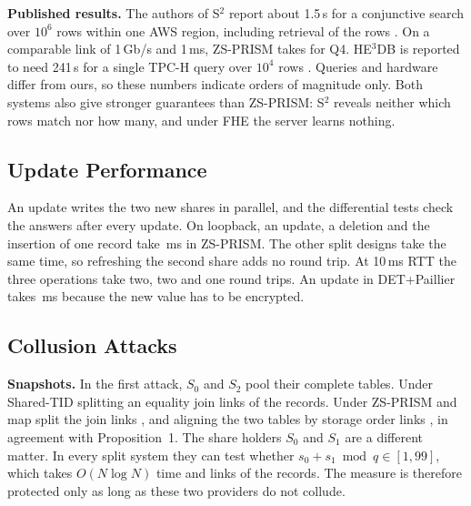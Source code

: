 \documentclass[conference]{IEEEtran}
\newcommand{\sys}{ZS-PRISM}
\begin{document}
\begin{table}[t]
\centering
\caption{Median query latency (ms) of SecretFlow-SCQL and the split designs on Adult and on $10^6$ records over an emulated 100\,Mb/s link with 20\,ms RTT.}
\label{tab:scql}
\scriptsize
\setlength{\tabcolsep}{3pt}

\end{table}

\textbf{Published results.} The authors of S$^2$ report about 1.5\,s for a conjunctive search over $10^6$ rows within one AWS region, including retrieval of the rows \cite{sharma2023s2}. On a comparable link of 1\,Gb/s and 1\,ms, \sys{} takes \EightZSQfourLan{} for Q4. HE$^3$DB is reported to need 241\,s for a single TPC-H query over $10^4$ rows \cite{bian2023he3db}. Queries and hardware differ from ours, so these numbers indicate orders of magnitude only. Both systems also give stronger guarantees than \sys{}: S$^2$ reveals neither which rows match nor how many, and under FHE the server learns nothing.

\subsection{Update Performance}
An update writes the two new shares in parallel, and the differential tests check the answers after every update. On loopback, an update, a deletion and the insertion of one record take \WriteZS{}\,ms in \sys{}. The other split designs take the same time, so refreshing the second share adds no round trip. At 10\,ms RTT the three operations take two, two and one round trips. An update in DET+Paillier takes \WritePaillier{}\,ms because the new value has to be encrypted.

\subsection{Collusion Attacks}\label{sec:attacks}
\textbf{Snapshots.} In the first attack, $S_0$ and $S_2$ pool their complete tables. Under Shared-TID splitting an equality join links \SnapShared{} of the records. Under \sys{} and map split the join links \SnapZS{}, and aligning the two tables by storage order links \SnapRankZS{}, in agreement with Proposition~1. The share holders $S_0$ and $S_1$ are a different matter. In every split system they can test whether $s_0+s_1\bmod q\in[1,99]$, which takes $O(N\log N)$ time and links \SnapShareSum{} of the records. The measure is therefore protected only as long as these two providers do not collude.
\end{document}
